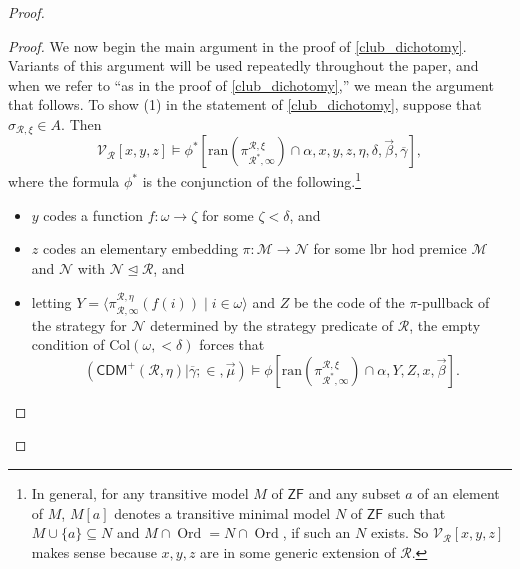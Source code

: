 \documentclass{amsart}
\renewcommand{\subset}{\subseteq}
\DeclareMathOperator{\ord}{Ord}
\begin{document}
\begin{proof}
\begin{proof}
    We now begin the main argument in the proof of \cref{club_dichotomy}.
    Variants of this argument will be used repeatedly throughout the paper, and when we refer to ``as in the proof of \cref{club_dichotomy},'' we mean the argument that follows.
    To show (1) in the statement of \cref{club_dichotomy}, suppose that $\sigma_{\mathcal{R}, \xi}\in A$.
    Then
    \[
    \mathcal{V}_{\mathcal{R}}[x, y, z]\models\phi^*[\mathrm{ran}(\pi^{\mathcal{R}, \xi}_{\mathcal{R}^*, \infty})\cap\alpha, x, y, z, \eta, \delta, \vec{\beta}, \overline{\gamma}],
    \]
    where the formula $\phi^*$ is the conjunction of the following.\footnote{In general, for any transitive model $M$ of $\mathsf{ZF}$ and any subset $a$ of an element of $M$, $M[a]$ denotes a transitive minimal model $N$ of $\mathsf{ZF}$ such that $M\cup\{a\}\subset N$ and $M\cap\ord=N\cap\ord$, if such an $N$ exists.
    So $\mathcal{V}_{\mathcal{R}}[x, y, z]$ makes sense because $x, y, z$ are in some generic extension of $\mathcal{R}$.}
    \begin{itemize}
        \item $y$ codes a function $f\colon\omega\to\zeta$ for some $\zeta<\delta$, and
        \item $z$ codes an elementary embedding $\pi\colon\mathcal{M}\to\mathcal{N}$ for some lbr hod premice $\mathcal{M}$ and $\mathcal{N}$ with $\mathcal{N}\trianglelefteq\mathcal{R}$, and 
        \item letting $Y=\langle\pi^{\mathcal{R}, \eta}_{\mathcal{R}, \infty}(f(i))\mid i\in\omega\rangle$ and $Z$ be the code of the $\pi$-pullback of the strategy for $\mathcal{N}$ determined by the strategy predicate of $\mathcal{R}$, the empty condition of $\mathrm{Col}(\omega, {<}\delta)$ forces that
        \[
        (\mathsf{CDM}^+(\mathcal{R}, \eta)\vert\overline{\gamma}; {\in}, \vec{\mu})\models\phi[\mathrm{ran}(\pi^{\mathcal{R}, \xi}_{\mathcal{R}^*, \infty})\cap\alpha, Y, Z, x, \vec{\beta}].
        \]
    \end{itemize}


\end{proof}
\end{proof}
\end{document}

